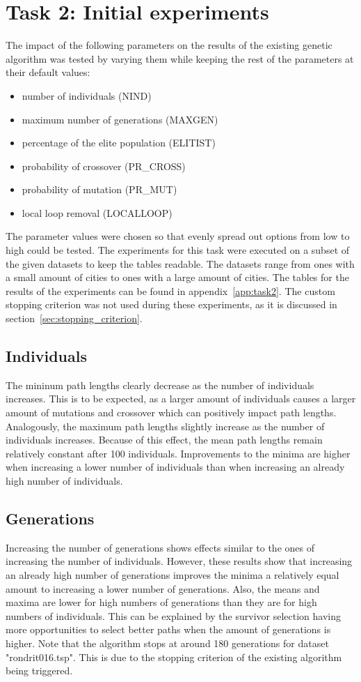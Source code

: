 \documentclass{report}
\begin{document}
\section{Task 2: Initial experiments}
The impact of the following parameters on the results of the existing genetic algorithm was tested by varying them while keeping the rest of the parameters at their default values:
\begin{itemize}
	\item number of individuals (NIND)
	\item maximum number of generations (MAXGEN)
	\item percentage of the elite population (ELITIST)
	\item probability of crossover (PR\_CROSS)
	\item probability of mutation (PR\_MUT)
	\item local loop removal (LOCALLOOP)
\end{itemize}
The parameter values were chosen so that evenly spread out options from low to high could be tested. The experiments for this task were executed on a subset of the given datasets to keep the tables readable. The datasets range from ones with a small amount of cities to ones with a large amount of cities. The tables for the results of the experiments can be found in appendix~\ref{app:task2}. The custom stopping criterion was not used during these experiments, as it is discussed in section~\ref{sec:stopping_criterion}.

\subsection{Individuals}
The mininum path lengths clearly decrease as the number of individuals increases. This is to be expected, as a larger amount of individuals causes a larger amount of mutations and crossover which can positively impact path lengths. Analogously, the maximum path lengths slightly increase as the number of individuals increases. Because of this effect, the mean path lengths remain relatively constant after 100 individuals. Improvements to the minima are higher when increasing a lower number of individuals than when increasing an already high number of individuals.

\subsection{Generations}
Increasing the number of generations shows effects similar to the ones of increasing the number of individuals. However, these results show that increasing an already high number of generations improves the minima a relatively equal amount to increasing a lower number of generations. Also, the means and maxima are lower for high numbers of generations than they are for high numbers of individuals. This can be explained by the survivor selection having more opportunities to select better paths when the amount of generations is higher.
Note that the algorithm stops at around 180 generations for dataset "rondrit016.tsp". This is due to the stopping criterion of the existing algorithm being triggered.
\end{document}
